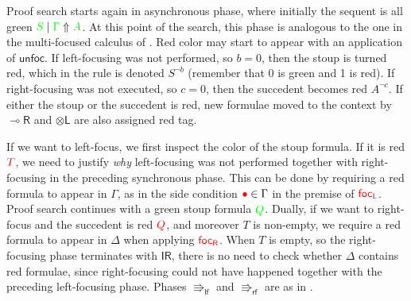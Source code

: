 \documentclass[runningheads]{llncs}
\newcommand{\tl}{\otimes \mathsf{L}}
\newcommand{\tr}{\otimes \mathsf{R}}
\newcommand{\lright}{{\multimap}\mathsf{R}}
\newcommand{\lleft}{{\multimap}\mathsf{L}}
\newcommand{\pass}{\mathsf{pass}}
\newcommand{\unitr}{\mathsf{IR}}
\newcommand{\otL}{\tl}
\newcommand{\otR}{\tr}
\newcommand{\lolliR}{\lright}
\newcommand{\lolliL}{\lleft}
\newcommand{\IR}{\unitr}
\newcommand{\lf}{\Rrightarrow_\mathsf{lf}}
\newcommand{\rf}{\Rrightarrow_\mathsf{rf}}
\newcommand{\red}[1]{{\color{red}#1}}
\newcommand{\green}[1]{{\color{green}#1}}
\newcommand{\up}{\Uparrow}
\newcommand{\focL}{\mathsf{foc_L}}
\newcommand{\focR}{\mathsf{foc_R}}
\newcommand{\unfoc}{\mathsf{unfoc}}
\begin{document}
Proof search starts again in asynchronous phase, where initially the sequent is all green $\green{S} \mid \green{\Gamma} \up \green{A}$. At this point of the search, this phase is analogous to the one in the multi-focused calculus of . Red color may start to appear with an application of $\unfoc$. If left-focusing was not performed, so $b = 0$, then the stoup is turned red, which in the rule is denoted $S^{\neg b}$ (remember that 0 is green and 1 is red). If right-focusing was not executed, so $c = 0$, then the succedent becomes red $A^{\neg c}$. If either the stoup or the succedent is red, new formulae moved to the context by $\lolliR$ and $\otL$ are also assigned red tag.

If we want to left-focus, we first inspect the color of the stoup formula. If it is red $\red{T}$, we need to justify \emph{why} left-focusing was not performed together with right-focusing in the preceding synchronous phase. This can be done by requiring a red formula to appear in $\Gamma$, as in the side condition $\red{\bullet} \in \Gamma$ in the premise of $\red{\focL}$. Proof search continues with a green stoup formula $\green{Q}$. Dually, if we want to right-focus and the succedent is red $\red{Q}$, and moreover $T$ is non-empty, we require a red formula to appear in $\Delta$ when applying $\red{\focR}$. When $T$ is empty, so the right-focusing phase terminates with $\IR$, there is no need to check whether $\Delta$ contains red formulae, since right-focusing could not have happened together with the preceding left-focusing phase. Phases $\lf$ and $\rf$ are as in .


\end{document}
